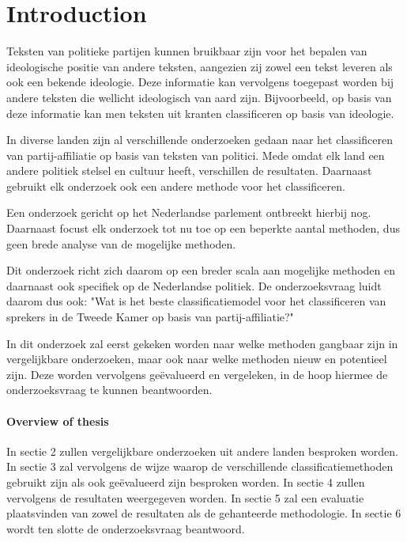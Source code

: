 \section{Introduction}
\label{sec:intro}
Teksten van politieke partijen kunnen bruikbaar zijn voor het bepalen van ideologische positie van andere teksten, aangezien zij zowel een tekst leveren als ook een bekende ideologie. Deze informatie kan vervolgens toegepast worden bij andere teksten die wellicht ideologisch van aard zijn. Bijvoorbeeld, op basis van deze informatie kan men teksten uit kranten classificeren op basis van ideologie.\par
In diverse landen zijn al verschillende onderzoeken gedaan naar het classificeren van partij-affiliatie op basis van teksten van politici.\cite{Ferreira2016UsingTT} Mede omdat elk land een andere politiek stelsel en cultuur heeft, verschillen de resultaten. Daarnaast gebruikt elk onderzoek ook een andere methode voor het classificeren. \par
Een onderzoek gericht op het Nederlandse parlement ontbreekt hierbij nog. Daarnaast focust elk onderzoek tot nu toe op een beperkte aantal methoden, dus geen brede analyse van de mogelijke methoden. \par
Dit onderzoek richt zich daarom op een breder scala aan mogelijke methoden en daarnaast ook specifiek op de Nederlandse politiek. De onderzoeksvraag luidt daarom dus ook: "Wat is het beste classificatiemodel voor het classificeren van sprekers in de Tweede Kamer op basis van partij-affiliatie?"\par
In dit onderzoek zal eerst gekeken worden naar welke methoden gangbaar zijn in vergelijkbare onderzoeken, maar ook naar welke methoden nieuw en potentieel zijn. Deze worden vervolgens geëvalueerd en vergeleken, in de hoop hiermee de onderzoeksvraag te kunnen beantwoorden.


\paragraph{Overview of thesis}
In sectie 2 zullen vergelijkbare onderzoeken uit andere landen besproken worden. In sectie 3 zal vervolgens de wijze waarop de verschillende classificatiemethoden gebruikt zijn als ook geëvalueerd zijn besproken worden. In sectie 4 zullen vervolgens de resultaten weergegeven worden. In sectie 5 zal een evaluatie plaatsvinden van zowel de resultaten als de gehanteerde methodologie. In sectie 6 wordt ten slotte de onderzoeksvraag beantwoord.
